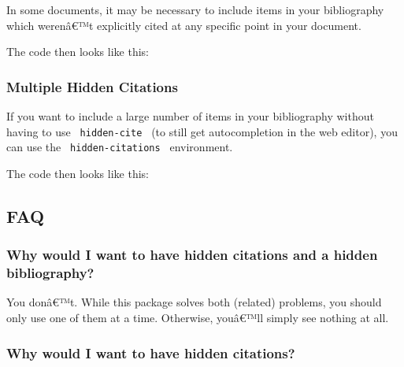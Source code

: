In some documents, it may be necessary to include items in your
bibliography which werenâ€™t explicitly cited at any specific point in
your document.

The code then looks like this:

\begin{Shaded}
\begin{Highlighting}[]

\end{Highlighting}
\end{Shaded}

\subsubsection{Multiple Hidden
Citations}\label{multiple-hidden-citations}

If you want to include a large number of items in your bibliography
without having to use \texttt{\ hidden-cite\ } (to still get
autocompletion in the web editor), you can use the
\texttt{\ hidden-citations\ } environment.

The code then looks like this:

\begin{Shaded}
\begin{Highlighting}[]

\NormalTok{\#hidden{-}citations[}
\NormalTok{]}
\end{Highlighting}
\end{Shaded}

\subsection{FAQ}\label{faq}

\subsubsection{Why would I want to have hidden citations and a hidden
bibliography?}\label{why-would-i-want-to-have-hidden-citations-and-a-hidden-bibliography}

You donâ€™t. While this package solves both (related) problems, you
should only use one of them at a time. Otherwise, youâ€™ll simply see
nothing at all.

\subsubsection{Why would I want to have hidden
citations?}\label{why-would-i-want-to-have-hidden-citations}

